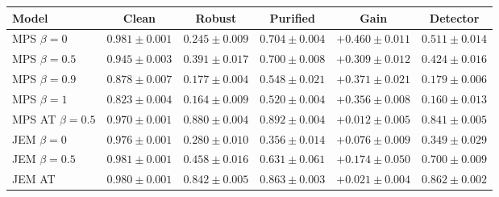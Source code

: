 \begin{tabular}{lccccc}
\toprule
Model & Clean & Robust & Purified & Gain & Detector \\
\midrule
MPS $\beta=0$ & $0.981 \pm 0.001$ & $0.245 \pm 0.009$ & $0.704 \pm 0.004$ & $\mathbf{+0.460 \pm 0.011}$ & $0.511 \pm 0.014$ \\
MPS $\beta=0.5$ & $0.945 \pm 0.003$ & $0.391 \pm 0.017$ & $0.700 \pm 0.008$ & $+0.309 \pm 0.012$ & $0.424 \pm 0.016$ \\
MPS $\beta=0.9$ & $0.878 \pm 0.007$ & $0.177 \pm 0.004$ & $0.548 \pm 0.021$ & $+0.371 \pm 0.021$ & $0.179 \pm 0.006$ \\
MPS $\beta=1$ & $0.823 \pm 0.004$ & $0.164 \pm 0.009$ & $0.520 \pm 0.004$ & $+0.356 \pm 0.008$ & $0.160 \pm 0.013$ \\
MPS AT $\beta=0.5$ & $0.970 \pm 0.001$ & $\mathbf{0.880 \pm 0.004}$ & $\mathbf{0.892 \pm 0.004}$ & $+0.012 \pm 0.005$ & $0.841 \pm 0.005$ \\
JEM $\beta=0$ & $0.976 \pm 0.001$ & $0.280 \pm 0.010$ & $0.356 \pm 0.014$ & $+0.076 \pm 0.009$ & $0.349 \pm 0.029$ \\
JEM $\beta=0.5$ & $\mathbf{0.981 \pm 0.001}$ & $0.458 \pm 0.016$ & $0.631 \pm 0.061$ & $+0.174 \pm 0.050$ & $0.700 \pm 0.009$ \\
JEM AT & $0.980 \pm 0.001$ & $0.842 \pm 0.005$ & $0.863 \pm 0.003$ & $+0.021 \pm 0.004$ & $\mathbf{0.862 \pm 0.002}$ \\
\bottomrule
\end{tabular}
